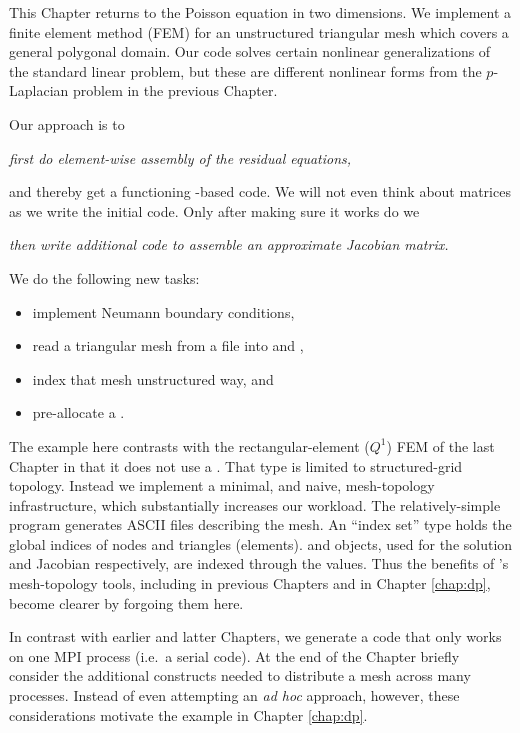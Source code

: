 
This Chapter returns to the Poisson equation in two dimensions.  We implement a finite element method (FEM) for an unstructured triangular mesh which covers a general polygonal domain.  Our code solves certain nonlinear generalizations of the standard linear problem, but these are different nonlinear forms from the $p$-Laplacian problem in the previous Chapter.

Our approach is to
\begin{center}
\emph{first do element-wise assembly of the residual equations,}
\end{center}
and thereby get a functioning \pSNES-based code.  We will not even think about matrices as we write the initial code.  Only after making sure it works do we
\begin{center}
\emph{then write additional code to assemble an approximate Jacobian matrix.}
\end{center}

We do the following new tasks:
\begin{itemize}
\item implement Neumann boundary conditions,
\item read a triangular mesh from a file into \PETSc \pVecs and \pISs,
\item index that mesh unstructured way, and
\item pre-allocate a \PETSc \pMat.
\end{itemize}

The example here contrasts with the rectangular-element ($Q^1$) FEM of the last Chapter in that it does not use a \pDMDA.  That type is limited to structured-grid topology.  Instead we implement a minimal, and naive, mesh-topology infrastructure, which substantially increases our workload.  The relatively-simple \Triangle program generates ASCII files describing the mesh.  An ``index set'' \pIS  type holds the global indices of nodes and triangles (elements).  \pVec and \pMat objects, used for the solution and Jacobian respectively, are indexed through the \pIS values.  Thus the benefits of \PETSc's mesh-topology \pDM tools, including \pDMDA in previous Chapters and \pDMPlex in Chapter \ref{chap:dp}, become clearer by forgoing them here.

In contrast with earlier and latter Chapters, we generate a code that only works on one MPI process (i.e.~a serial code).  At the end of the Chapter briefly consider the additional constructs needed to distribute a mesh across many processes.  Instead of even attempting an \emph{ad hoc} approach, however, these considerations motivate the \pDMPlex example in Chapter \ref{chap:dp}.

